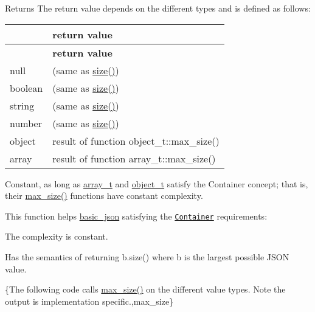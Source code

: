\begin{DoxyReturn}{Returns}
The return value depends on the different types and is defined as follows\+: \tabulinesep=1mm
\begin{longtabu} spread 0pt [c]{*2{|X[-1]}|}
\hline
{}&{\bf return value  }\\
\endfirsthead
\hline
\endfoot
\hline
{}&{\bf return value  }\\
\endhead
null &{} (same as {\ttfamily \hyperlink{a00025_a01833b332b68d9af1f7cd7a816c39e49}{size()}}) \\
boolean &{} (same as {\ttfamily \hyperlink{a00025_a01833b332b68d9af1f7cd7a816c39e49}{size()}}) \\
string &{} (same as {\ttfamily \hyperlink{a00025_a01833b332b68d9af1f7cd7a816c39e49}{size()}}) \\
number &{} (same as {\ttfamily \hyperlink{a00025_a01833b332b68d9af1f7cd7a816c39e49}{size()}}) \\
object &result of function {\ttfamily object\+\_\+t\+::max\+\_\+size()} \\
array &result of function {\ttfamily array\+\_\+t\+::max\+\_\+size()} \\
\end{longtabu}
Constant, as long as \hyperlink{a00025_ab00b882d39306d663c23dab110f5cae0}{array\+\_\+t} and \hyperlink{a00025_a0ac9894c9de8dc551cf2e5f1c605537f}{object\+\_\+t} satisfy the Container concept; that is, their {\ttfamily \hyperlink{a00025_ad5514a7435f246fc5335856465022a7a}{max\+\_\+size()}} functions have constant complexity.
\end{DoxyReturn}
This function helps {\ttfamily \hyperlink{a00025}{basic\+\_\+json}} satisfying the \href{http://en.cppreference.com/w/cpp/concept/Container}{\tt Container} requirements\+:
\begin{DoxyItemize}
\item The complexity is constant.
\item Has the semantics of returning {\ttfamily b.\+size()} where {\ttfamily b} is the largest possible J\+S\+ON value.
\end{DoxyItemize}

\{The following code calls {\ttfamily \hyperlink{a00025_ad5514a7435f246fc5335856465022a7a}{max\+\_\+size()}} on the different value types. Note the output is implementation specific.,max\+\_\+size\}

